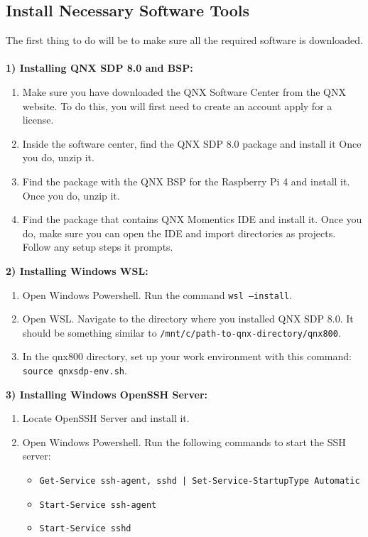 \documentclass[12pt]{article}
\begin{document}
\subsection{Install Necessary Software Tools}
The first thing to do will be to make sure all the required software is downloaded.\\\\
\textbf{1) Installing QNX SDP 8.0 and BSP:}
\begin{enumerate}
    \item Make sure you have downloaded the QNX Software Center from the QNX website. To do this, you will first need to create an account apply for a license.
    \item Inside the software center, find the QNX SDP 8.0 package and install it Once you do, unzip it.
    \item Find the package with the QNX BSP for the Raspberry Pi 4 and install it. Once you do, unzip it.
    \item Find the package that contains QNX Momentics IDE and install it. Once you do, make sure you can open the IDE and import directories as projects. Follow any setup steps it prompts.
\end{enumerate}

\textbf{2) Installing Windows WSL:}
\begin{enumerate}
    \item Open Windows Powershell. Run the command \texttt{wsl --install}.
    \item Open WSL. Navigate to the directory where you installed QNX SDP 8.0. It should be something similar to \texttt{/mnt/c/path-to-qnx-directory/qnx800}.
    \item In the qnx800 directory, set up your work environment with this command: \texttt{source qnxsdp-env.sh}.
\end{enumerate}

\textbf{3) Installing Windows OpenSSH Server:}
\begin{enumerate}
    \item Locate OpenSSH Server and install it.
    \item Open Windows Powershell. Run the following commands to start the SSH server:
    \begin{itemize}
        \item \texttt{Get-Service ssh-agent, sshd | Set-Service-StartupType Automatic}
        \item \texttt{Start-Service ssh-agent}
        \item \texttt{Start-Service sshd}
    \end{itemize}
\end{enumerate}
\end{document}
